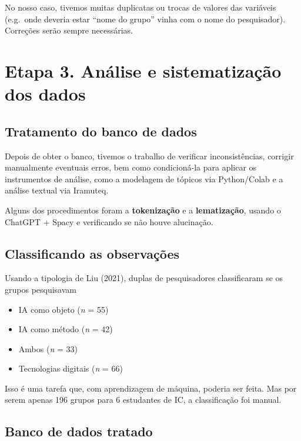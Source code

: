 \documentclass[
  brazilian,
  letterpaper,
  DIV=11,
  numbers=noendperiod]{scrartcl}
\providecommand{\tightlist}{%
  \setlength{\itemsep}{0pt}\setlength{\parskip}{0pt}}
\begin{document}
No nosso caso, tivemos muitas duplicatas ou trocas de valores das
variáveis (e.g.~onde deveria estar ``nome do grupo'' vinha com o nome do
pesquisador). Correções serão sempre necessárias.

\section{Etapa 3. Análise e sistematização dos
dados}\label{etapa-3.-anuxe1lise-e-sistematizauxe7uxe3o-dos-dados}

\subsection{Tratamento do banco de
dados}\label{tratamento-do-banco-de-dados}

Depois de obter o banco, tivemos o trabalho de verificar
inconsistências, corrigir manualmente eventuais erros, bem como
condicioná-la para aplicar os instrumentos de análise, como a modelagem
de tópicos via Python/Colab e a análise textual via Iramuteq.

Alguns dos procedimentos foram a \textbf{tokenização} e a
\textbf{lematização}, usando o ChatGPT + Spacy e verificando se não
houve alucinação.

\subsection{Classificando as
observações}\label{classificando-as-observauxe7uxf5es}

Usando a tipologia de Liu (2021), duplas de pesquisadores classificaram
se os grupos pesquisavam

\begin{itemize}
\tightlist
\item
  IA como objeto (\emph{n} = 55)
\item
  IA como método (\emph{n} = 42)
\item
  Ambos (\emph{n} = 33)
\item
  Tecnologias digitais (\emph{n} = 66)
\end{itemize}

Isso é uma tarefa que, com aprendizagem de máquina, poderia ser feita.
Mas por serem apenas 196 grupos para 6 estudantes de IC, a classificação
foi manual.

\subsection{Banco de dados tratado}\label{banco-de-dados-tratado}
\end{document}
